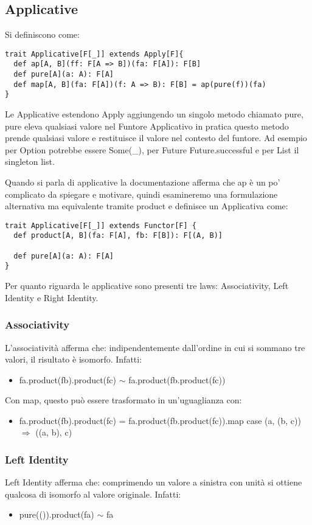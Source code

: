 \subsection{Applicative}
Si definiscono come:

\begin{verbatim}
trait Applicative[F[_]] extends Apply[F]{
  def ap[A, B](ff: F[A => B])(fa: F[A]): F[B]
  def pure[A](a: A): F[A]
  def map[A, B](fa: F[A])(f: A => B): F[B] = ap(pure(f))(fa)
}
\end{verbatim}

\noindent Le Applicative estendono Apply aggiungendo un singolo metodo chiamato pure, pure eleva qualsiasi valore nel Funtore Applicativo in pratica questo metodo prende qualsiasi valore e restituisce il valore nel contesto del funtore. Ad esempio per Option potrebbe essere Some(\_), per Future Future.successful e per List il singleton list.

\noindent Quando si parla di applicative la documentazione afferma che ap è un po' complicato da spiegare e motivare, quindi esamineremo una formulazione alternativa ma equivalente tramite product e definisce un Applicativa come:
\begin{verbatim}
trait Applicative[F[_]] extends Functor[F] {
  def product[A, B](fa: F[A], fb: F[B]): F[(A, B)]

  def pure[A](a: A): F[A]
}
\end{verbatim}

\noindent Per quanto riguarda le applicative sono presenti tre laws: Associativity, Left Identity e Right Identity.

\subsubsection{Associativity}
L'associatività afferma che: indipendentemente dall'ordine in cui si sommano tre valori, il risultato è isomorfo.
Infatti:
\begin{itemize}
    \item fa.product(fb).product(fc) $\sim$ fa.product(fb.product(fc))
\end{itemize}
\noindent Con map, questo può essere trasformato in un'uguaglianza con:
\begin{itemize}
    \item fa.product(fb).product(fc) = fa.product(fb.product(fc)).map { case (a, (b, c)) $\Rightarrow$ ((a, b), c) }
\end{itemize}

\subsubsection{Left Identity}
\noindent Left Identity afferma che: comprimendo un valore a sinistra con unità si ottiene qualcosa di isomorfo al valore originale.
Infatti:
\begin{itemize}
    \item pure(()).product(fa) $\sim$ fa
\end{itemize}


